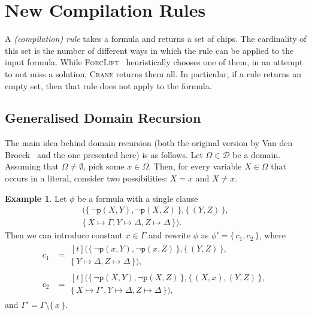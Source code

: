 \documentclass{article}
\theoremstyle{definition}
\newtheorem{example}{Example}
\begin{document}
\section{New Compilation Rules}\label{sec:rules}

A \emph{(compilation) rule} takes a formula and returns a set of chips. The
cardinality of this set is the number of different ways in which the rule can be
applied to the input formula. While
\textsc{ForcLift}~\cite{DBLP:conf/ijcai/BroeckTMDR11} heuristically chooses one
of them, in an attempt to not miss a solution, \textsc{Crane} returns them all.
In particular, if a rule returns an empty set, then that rule does not apply to
the formula.

\subsection{Generalised Domain Recursion}\label{sec:dr}

The main idea behind domain recursion (both the original version by Van den
Broeck~ and the one presented here) is as
follows. Let $\Omega \in \mathcal{D}$ be a domain. Assuming that
$\Omega \ne \emptyset$, pick some $x \in \Omega$. Then, for every variable
$X \in \Omega$ that occurs in a literal, consider two possibilities: $X = x$ and
$X \ne x$.

\begin{example}\label{example:dr}
  Let $\phi$ be a formula with a single clause
  \begin{multline*}
    (\{\, \neg \texttt{p}(X, Y), \neg \texttt{p}(X, Z) \,\}, \{\, (Y, Z) \,\}, \\
    \{\, X \mapsto \Gamma, Y \mapsto \Delta, Z \mapsto \Delta \,\}).
  \end{multline*}
  Then we can introduce constant $x \in \Gamma$ and rewrite $\phi$ as
  $\phi' = \{\, c_{1}, c_{2} \,\}$, where
  \begin{align*}
    c_{1} &= \begin{multlined}[t]
      (\{\, \neg \texttt{p}(x, Y), \neg \texttt{p}(x, Z) \,\}, \{\, (Y, Z) \,\}, \\
      \{\, Y \mapsto \Delta, Z \mapsto \Delta \,\}),
      \end{multlined}\\
    c_{2} &= \begin{multlined}[t]
      (\{\, \neg \texttt{p}(X, Y), \neg \texttt{p}(X, Z) \,\}, \{\, (X, x), (Y, Z) \,\}, \\
      \{\, X \mapsto \Gamma', Y \mapsto \Delta, Z \mapsto \Delta \,\}),
      \end{multlined}
  \end{align*}
  and $\Gamma' = \Gamma \setminus \{\, x \,\}$.
\end{example}
\end{document}
